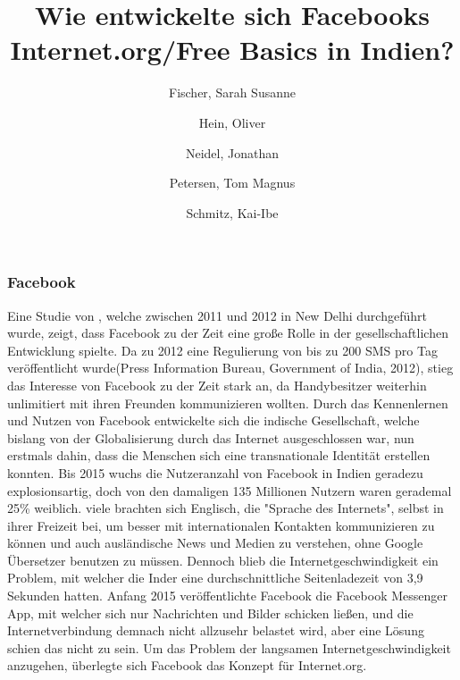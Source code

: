 \documentclass{article}
\title{Wie entwickelte sich Facebooks Internet.org/Free Basics in Indien?}
\author{
  Fischer, Sarah Susanne\\
  \and
  Hein, Oliver\\
  \and
  Neidel, Jonathan\\
  \and
  Petersen, Tom Magnus\\
  \and
  Schmitz, Kai-Ibe\\
}
\begin{document}
\maketitle
\subsubsection {Facebook}
Eine Studie von \textcite{empowermentThroughFacebook}, welche zwischen 2011 und 2012 in New Delhi durchgeführt wurde, zeigt, dass Facebook zu der Zeit eine große Rolle in der gesellschaftlichen Entwicklung spielte. 
\medskip
Da zu 2012 eine Regulierung von bis zu 200 SMS pro Tag veröffentlicht wurde(Press Information Bureau,
Government of India, 2012), stieg das Interesse von Facebook zu der Zeit stark an,
da Handybesitzer weiterhin unlimitiert mit ihren Freunden kommunizieren wollten.
Durch das Kennenlernen und Nutzen von Facebook entwickelte sich die indische Gesellschaft, welche bislang von der Globalisierung durch das Internet ausgeschlossen war, nun erstmals dahin, dass die Menschen sich eine transnationale Identität erstellen konnten.
\medskip
Bis 2015 wuchs die Nutzeranzahl von Facebook in Indien geradezu explosionsartig, doch von den damaligen 135 Millionen Nutzern waren gerademal 25\% weiblich\autocite{slideshareIndia}.
\medskip
viele brachten sich Englisch, die "Sprache des Internets", 
selbst in ihrer Freizeit bei, um besser mit internationalen Kontakten
kommunizieren zu können und auch ausländische News und Medien zu verstehen, ohne Google Übersetzer benutzen zu müssen.
\medskip
Dennoch blieb die Internetgeschwindigkeit ein Problem, mit welcher die Inder eine durchschnittliche Seitenladezeit von 3,9 Sekunden hatten\autocite{mashable}. Anfang 2015 veröffentlichte Facebook die Facebook Messenger App, mit welcher sich nur Nachrichten und Bilder schicken ließen, und die Internetverbindung demnach nicht allzusehr belastet wird, aber eine Lösung schien das nicht zu sein.
\medskip
Um das Problem der langsamen Internetgeschwindigkeit anzugehen, überlegte sich Facebook das Konzept für Internet.org.


\end{document}
